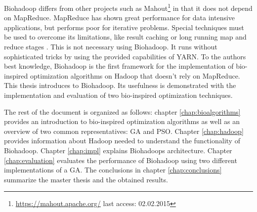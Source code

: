 Biohadoop differs from other projects such as Mahout\footnote{\url{https://mahout.apache.org/} last access: 02.02.2015} in that it does not depend on MapReduce. MapReduce has shown great performance for data intensive applications, but performs poor for iterative problems. Special techniques must be used to overcome its limitations, like result caching \cite{bu2010haloop} or long running map and reduce stages \cite{ekanayake2010twister}. This is not necessary using Biohadoop. It runs without sophisticated tricks by using the provided capabilities of YARN. To the authors best knowledge, Biohadoop is the first framework for the implementation of bio-inspired optimization algorithms on Hadoop that doesn't rely on MapReduce. This thesis introduces to Biohadoop. Its usefulness is demonstrated with the implementation and evaluation of two bio-inspired optimization techniques.

The rest of the document is organized as follows: chapter \ref{chap:bioalgorithms} provides an introduction to bio-inspired optimization algorithms as well as an overview of two common representatives: GA and PSO. Chapter \ref{chap:hadoop} provides information about Hadoop needed to understand the functionality of Biohadoop. Chapter \ref{chap:impl} explains Biohadoops architecture. Chapter \ref{chap:evaluation} evaluates the performance of Biohadoop using two different implementations of a GA. The conclusions in chapter \ref{chap:conclusions} summarize the master thesis and the obtained results.